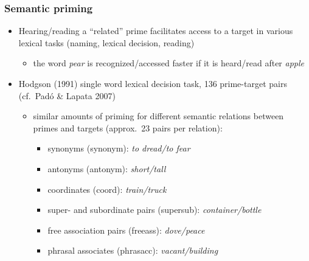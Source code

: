 \begin{frame}
  \frametitle{Semantic priming}
  \begin{itemize}
  \item Hearing/reading a ``related'' prime facilitates access to a
    target in various lexical tasks (naming, lexical decision,
    reading)
    \begin{itemize}
  \item  the word \emph{pear} is recognized/accessed faster if it is
    heard/read after \emph{apple}
    \end{itemize}
    \pause
  \item Hodgson (1991) single word lexical decision task, 136
    prime-target pairs (cf.\ Padó \& Lapata 2007)
    \begin{itemize}
  \item similar amounts of priming for different
    semantic relations between primes and targets (approx.~23 pairs
    per relation):
    \begin{itemize}
    \item synonyms (synonym): \emph{to dread/to fear}
    \item antonyms (antonym): \emph{short/tall}
    \item coordinates (coord): \emph{train/truck}
    \item super- and subordinate pairs (supersub): \emph{container/bottle}
    \item free association pairs (freeass): \emph{dove/peace}
    \item phrasal associates (phrasacc): \emph{vacant/building}
    \end{itemize}
  \end{itemize}
\end{itemize}
\end{frame}



